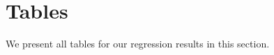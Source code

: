 \documentclass[12pt]{article}
\begin{document}
	\clearpage
	
	\singlespacing
	
	
	
	
	
	\clearpage
	
	\onehalfspacing
	
	\appendix
	
	\section{Tables} \label{sec:tab}
	
	We present all tables for our regression results in this section.
	
\end{document}
